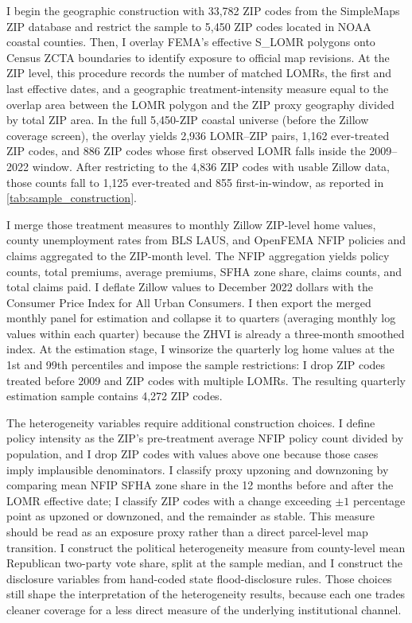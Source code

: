 \documentclass[12pt]{article}
\begin{document}
I begin the geographic construction with 33,782 ZIP codes from the SimpleMaps ZIP database and restrict the sample to 5,450 ZIP codes located in NOAA coastal counties. Then, I overlay FEMA's effective S\_LOMR polygons onto Census ZCTA boundaries to identify exposure to official map revisions. At the ZIP level, this procedure records the number of matched LOMRs, the first and last effective dates, and a geographic treatment-intensity measure equal to the overlap area between the LOMR polygon and the ZIP proxy geography divided by total ZIP area. In the full 5,450-ZIP coastal universe (before the Zillow coverage screen), the overlay yields 2,936 LOMR--ZIP pairs, 1,162 ever-treated ZIP codes, and 886 ZIP codes whose first observed LOMR falls inside the 2009--2022 window. After restricting to the 4,836 ZIP codes with usable Zillow data, those counts fall to 1,125 ever-treated and 855 first-in-window, as reported in \autoref{tab:sample_construction}.

I merge those treatment measures to monthly Zillow ZIP-level home values, county unemployment rates from BLS LAUS, and OpenFEMA NFIP policies and claims aggregated to the ZIP-month level. The NFIP aggregation yields policy counts, total premiums, average premiums, SFHA zone share, claims counts, and total claims paid. I deflate Zillow values to December 2022 dollars with the Consumer Price Index for All Urban Consumers. I then export the merged monthly panel for estimation and collapse it to quarters (averaging monthly log values within each quarter) because the ZHVI is already a three-month smoothed index. At the estimation stage, I winsorize the quarterly log home values at the 1st and 99th percentiles and impose the sample restrictions: I drop ZIP codes treated before 2009 and ZIP codes with multiple LOMRs. The resulting quarterly estimation sample contains 4,272 ZIP codes.

The heterogeneity variables require additional construction choices. I define policy intensity as the ZIP's pre-treatment average NFIP policy count divided by population, and I drop ZIP codes with values above one because those cases imply implausible denominators. I classify proxy upzoning and downzoning by comparing mean NFIP SFHA zone share in the 12 months before and after the LOMR effective date; I classify ZIP codes with a change exceeding $\pm 1$ percentage point as upzoned or downzoned, and the remainder as stable. This measure should be read as an exposure proxy rather than a direct parcel-level map transition. I construct the political heterogeneity measure from county-level mean Republican two-party vote share, split at the sample median, and I construct the disclosure variables from hand-coded state flood-disclosure rules. Those choices still shape the interpretation of the heterogeneity results, because each one trades cleaner coverage for a less direct measure of the underlying institutional channel.
\end{document}
